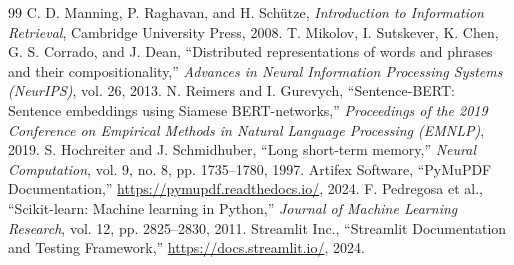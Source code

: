 \documentclass[12pt,a4paper]{report}
\begin{document}
\begin{thebibliography}{99}
 C. D. Manning, P. Raghavan, and H. Schütze, \textit{Introduction to Information Retrieval}, Cambridge University Press, 2008.
 T. Mikolov, I. Sutskever, K. Chen, G. S. Corrado, and J. Dean, ``Distributed representations of words and phrases and their compositionality,'' \textit{Advances in Neural Information Processing Systems (NeurIPS)}, vol. 26, 2013.
 N. Reimers and I. Gurevych, ``Sentence-BERT: Sentence embeddings using Siamese BERT-networks,'' \textit{Proceedings of the 2019 Conference on Empirical Methods in Natural Language Processing (EMNLP)}, 2019.
 S. Hochreiter and J. Schmidhuber, ``Long short-term memory,'' \textit{Neural Computation}, vol. 9, no. 8, pp. 1735--1780, 1997.
 Artifex Software, ``PyMuPDF Documentation,'' \url{https://pymupdf.readthedocs.io/}, 2024.
 F. Pedregosa et al., ``Scikit-learn: Machine learning in Python,'' \textit{Journal of Machine Learning Research}, vol. 12, pp. 2825--2830, 2011.
 Streamlit Inc., ``Streamlit Documentation and Testing Framework,'' \url{https://docs.streamlit.io/}, 2024.
\end{thebibliography}
\end{document}
